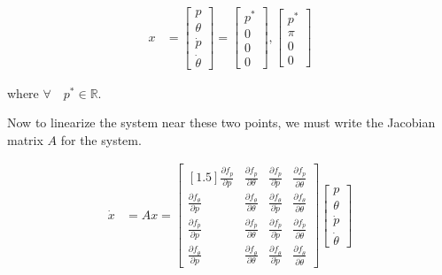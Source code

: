 \documentclass[11pt]{article}
\theoremstyle{definition}
\begin{document}
\begin{enumerate}
\begin{enumerate}
        \begin{align}
            x &= \begin{bmatrix} p \\ \theta \\ \dot{p} \\ \dot{\theta} \end{bmatrix} = \begin{bmatrix} p^* \\ 0 \\ 0 \\ 0 \end{bmatrix}, \begin{bmatrix} p^* \\ \pi \\ 0 \\ 0 \end{bmatrix}
        \end{align}

        where $ \forall \quad p^* \in \mathbb{R}$.

        Now to linearize the system near these two points, we must write the Jacobian matrix $A$ for the system.

        \begin{align}
            \dot{x} &= Ax = \begin{bmatrix}[1.5]
                \frac{\partial f_p}{\partial p} & \frac{\partial f_p}{\partial \theta} & \frac{\partial f_p}{\partial \dot{p}} & \frac{\partial f_p}{\partial \dot{\theta}} \\
                 \frac{\partial f_{\theta}}{\partial p} & \frac{\partial f_{\theta}}{\partial \theta} & \frac{\partial f_{\theta}}{\partial \dot{p}} & \frac{\partial f_{\theta}}{\partial \dot{\theta}} \\ 
                 \frac{\partial f_{\dot{p}}}{\partial p} & \frac{\partial f_{\dot{p}}}{\partial \theta} & \frac{\partial f_{\dot{p}}}{\partial \dot{p}} & \frac{\partial f_{\dot{p}}}{\partial \dot{\theta}} \\ 
                 \frac{\partial f_{\dot{\theta}}}{\partial p} & \frac{\partial f_{\dot{\theta}}}{\partial \theta} & \frac{\partial f_{\dot{\theta}}}{\partial \dot{p}} & \frac{\partial f_{\dot{\theta}}}{\partial \dot{\theta}}
             \end{bmatrix}
             \begin{bmatrix}
                p \\ \theta \\ \dot{p} \\ \dot{\theta}
             \end{bmatrix}\\
        \end{align}


\end{enumerate}
\end{enumerate}
\end{document}
